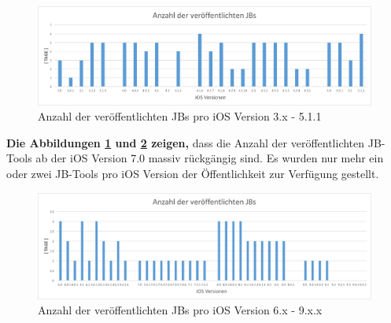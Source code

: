 \begin{figure}[hp!]
        \centering
                \includegraphics[scale=0.5]{Bilder/iOSJB1.png}
        \caption{Anzahl der veröffentlichten JBs pro iOS Version 3.x - 5.1.1 \protect\footnotemark}
        \label{fig:AnalyseAnzahliOSJB1}
\end{figure}
{}

\textbf{Die Abbildungen \ref{fig:AnalyseAnzahliOSJB1} und \ref{fig:AnalyseAnzahliOSJB2} zeigen,} dass die Anzahl der veröffentlichten JB-Tools ab der iOS Version 7.0 massiv rückgängig sind. Es wurden nur mehr ein oder zwei JB-Tools pro iOS Version der Öffentlichkeit zur Verfügung gestellt. 

\begin{figure}[hp!]
        \centering
                \includegraphics[scale=0.5]{Bilder/iOSJB2.png}
        \caption{Anzahl der veröffentlichten JBs pro iOS Version 6.x - 9.x.x \protect\footnotemark}
        \label{fig:AnalyseAnzahliOSJB2}
\end{figure}
{}

